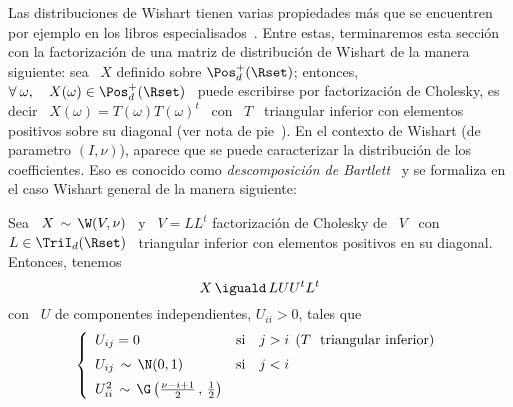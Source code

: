 Las distribuciones de Wishart tienen  varias propiedades m\'as que se encuentren
por ejemplo  en los  libros especialisados~\cite{Mui82, GupNag99,  And03, Seb04,
  KotNad04}. Entre estas, terminaremos  esta secci\'on con la factorizaci\'on de
una  matriz de  distribuci\'on de  Wishart  de la  manera siguiente:  sea \  $X$
definido  sobre  $\Pos_d^+(\Rset)$;  entonces,   \  $\forall  \:  \omega,  \quad
X(\omega)  \in  \Pos_d^+(\Rset)$  \  puede  escribirse  por  factorizaci\'on  de
Cholesky,  es  decir  \ $X(\omega)  =  T(\omega)  T(\omega)^t$  \  con \  $T$  \
triangular  inferior con  elementos positivos  sobre  su diagonal  (ver nota  de
pie~\footref{Foot:MP:WishartXtilde}).  En  el contexto de  Wishart (de parametro
$(I,\nu)$),  aparece  que  se   puede  caracterizar  la  distribuci\'on  de  los
coefficientes.     Eso    es   conocido    como    {\em   descomposici\'on    de
  Bartlett}~\cite{Bar34,  Mui82,  BilBre99,  GupNag99,  And03,  KotNad04}  y  se
formaliza en el caso Wishart general de la manera siguiente:
%
\begin{teorema}\label{Teo:MP:Bartlett}
%
  Sea \ $X \,  \sim \, \W(V,\nu)$ \ y \ $V =  L L^t$ factorizaci\'on de Cholesky
  de  \ $V$  \ con  \ $L  \in \TriI_d(\Rset)$  \ triangular  inferior con elementos positivos en su diagonal. Entonces,
  tenemos
  \[
  X \, \iguald \, L U U^t L^t
  \]
  con \ $U$ de componentes independientes, $U_{ii} > 0$, tales que
  \[
  \left\{\begin{array}{lll}
  U_{ij} = 0 & \mbox{si} & j > i \:\: \mbox{($T$ \ triangular inferior)}\\[2mm]
  U_{ij} \, \sim \, \N(0,1) & \mbox{si} & j < i\\[2mm]
  U_{ii}^2 \, \sim \, \G\left( \frac{\nu-i+1}{2} \, , \, \frac12 \right) & &
  \end{array}\right.
  \]
\end{teorema}
%
